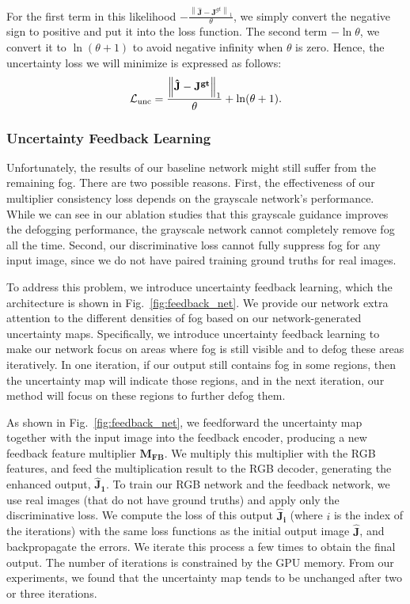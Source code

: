 \documentclass[runningheads]{llncs}
\begin{document}
For the first term in this likelihood $-\frac{\left \| \mathbf{\hat{J}} - \mathbf{J}^{gt} \right \|_1}{\theta}$, we simply convert the negative sign to positive and put it into the loss function. 
The second term  $-\ln \theta$, we convert it to $\ln(\theta + 1)$ to avoid negative infinity when $\theta$ is zero.
Hence, the uncertainty loss we will minimize is expressed as follows:
\begin{align}
\mathcal{L}_{\rm unc} =  \frac{\left \| \mathbf{\hat{J}} - \mathbf{J^{gt}} \right \|_1}{\theta} + \ln (\theta + 1).
\label{eq:uncertainty_synt}
\end{align}

\subsubsection{Uncertainty Feedback Learning}
Unfortunately, the results of our baseline network might still suffer from the remaining fog.
There are two possible reasons.
First, the effectiveness of our multiplier consistency loss depends on the grayscale network's performance. 
While we can see in our ablation studies that this grayscale guidance improves the defogging performance, the grayscale network cannot completely remove fog all the time. 
Second, our discriminative loss cannot fully suppress fog for any input image, since we do not have paired training ground truths for real images.

To address this problem, we introduce uncertainty feedback learning, which the architecture is shown in Fig.~\ref{fig:feedback_net}.
We provide our network extra attention to the different densities of fog based on our network-generated uncertainty maps.
Specifically, we introduce uncertainty feedback learning to make our network focus on areas where fog is still visible and to defog these areas iteratively.
In one iteration, if our output still contains fog in some regions, then the uncertainty map will indicate those regions, and in the next iteration, our method will focus on these regions to further defog them.

As shown in Fig.~\ref{fig:feedback_net}, we feedforward the uncertainty map together with the input image into the feedback encoder, producing a new feedback feature multiplier $\mathbf{M_{FB}}$. 
We multiply this multiplier with the RGB features, and feed the multiplication result to the RGB decoder, generating the enhanced output, $\mathbf{\hat{J}_1}$.
To train our RGB network and the feedback network, we use real images (that do not have ground truths) and apply only the discriminative loss.
We compute the loss of this output $\mathbf{\hat{J}_i}$ (where $i$ is the index of the iterations) with the same loss functions as the initial output image $\mathbf{\hat{J}}$, and backpropagate the errors.
We iterate this process a few times to obtain the final output. 
The number of iterations is constrained by the GPU memory. From our experiments, we found that the uncertainty map tends to be unchanged after two or three iterations.
\end{document}
